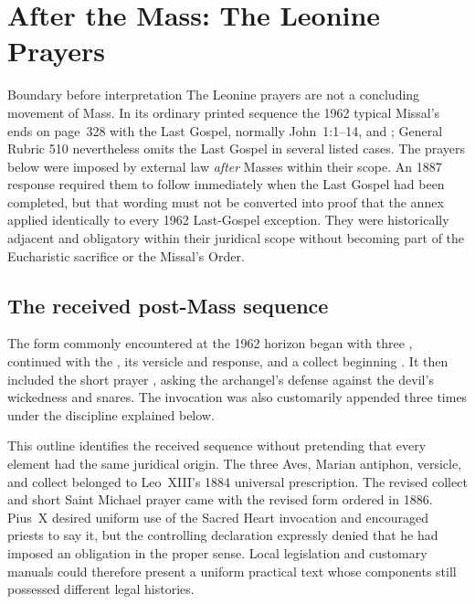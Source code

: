 \section*{After the Mass: The Leonine Prayers}

\begin{massbox}{Boundary before interpretation}
The Leonine prayers are not a concluding movement of Mass. In its ordinary printed sequence the 1962 typical Missal's  ends on page~328 with the Last Gospel, normally John~1:1--14, and ; General Rubric 510 nevertheless omits the Last Gospel in several listed cases. The prayers below were imposed by external law \emph{after} Masses within their scope. An 1887 response required them to follow immediately when the Last Gospel had been completed, but that wording must not be converted into proof that the annex applied identically to every 1962 Last-Gospel exception. They were historically adjacent and obligatory within their juridical scope without becoming part of the Eucharistic sacrifice or the Missal's Order.
\end{massbox}

\subsection*{The received post-Mass sequence}

The form commonly encountered at the 1962 horizon began with three , continued with the , its versicle  and response, and a collect beginning . It then included the short prayer , asking the archangel's defense against the devil's wickedness and snares. The invocation  was also customarily appended three times under the discipline explained below.

This outline identifies the received sequence without pretending that every element had the same juridical origin. The three Aves, Marian antiphon, versicle, and collect belonged to Leo~XIII's 1884 universal prescription. The revised collect and short Saint Michael prayer came with the revised form ordered in 1886. Pius~X desired uniform use of the Sacred Heart invocation and encouraged priests to say it, but the controlling declaration expressly denied that he had imposed an obligation in the proper sense. Local legislation and customary manuals could therefore present a uniform practical text whose components still possessed different legal histories.

